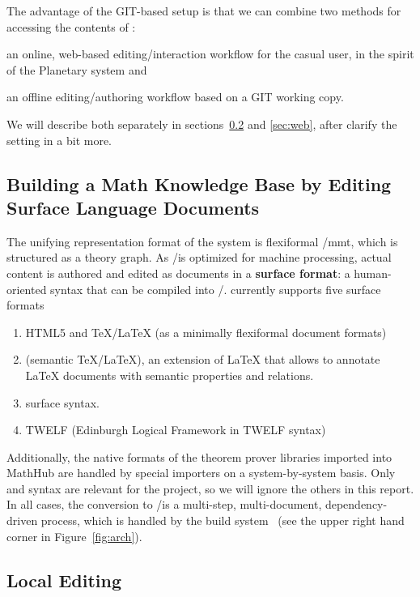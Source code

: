 The advantage of the GIT-based setup is that we can combine two methods for accessing the
contents of \sys:
\begin{compactenum}[\em i\rm)]
\item an online, web-based editing/interaction workflow for the casual user, in the spirit
  of the Planetary system and
\item an offline editing/authoring workflow based on a GIT working copy.
\end{compactenum}
We will describe both separately in sections~\ref{sec:lmh} and \ref{sec:web}, after
clarify the setting in \sys a bit more. 

\subsection{Building a Math Knowledge Base by Editing Surface Language Documents}\label{sec:surface}

The unifying representation format of the \sys system is flexiformal \omdoc/mmt, which is
structured as a theory graph. As \omdoc/\mmt is optimized for machine processing, actual
content is authored and edited as documents in a \textbf{surface format}: a human-oriented
syntax that can be compiled into \omdoc/\mmt. \sys currently supports five surface formats 
\begin{enumerate}
\item HTML5 and TeX/LaTeX (as a minimally flexiformal document formats)
\item \sTeX (semantic {\TeX/\LaTeX}), an extension of {\LaTeX} that allows to annotate
  {\LaTeX} documents with semantic properties and relations.
\item \mmt surface syntax.
\item TWELF (Edinburgh Logical Framework in TWELF syntax)
\end{enumerate}
Additionally, the native formats of the theorem prover libraries imported into MathHub are
handled by special importers on a system-by-system basis. Only \sTeX and \mmt syntax are
relevant for the \pn project, so we will ignore the others in this report. In all cases,
the conversion to \omdoc/\mmt is a multi-step, multi-document, dependency-driven process,
which is handled by the \mmt build system~\cite{mmt:buildsys:on} (see the upper right hand
corner in Figure~\ref{fig:arch}).

\subsection{Local \sys Editing}\label{sec:lmh}

